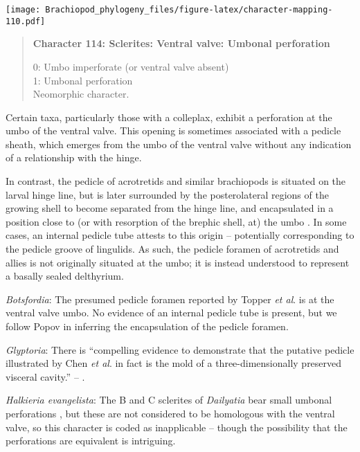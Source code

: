 \documentclass[openany]{book}
\theoremstyle{definition}
\theoremstyle{definition}
\theoremstyle{definition}
\theoremstyle{remark}
\begin{document}
\texttt{[image: Brachiopod\_phylogeny\_files/figure-latex/character-mapping-110.pdf]}

\begin{quote}
\textbf{Character 114: Sclerites: Ventral valve: Umbonal perforation}

0: Umbo imperforate (or ventral valve absent)\\
1: Umbonal perforation\\
Neomorphic character.
\end{quote}

Certain taxa, particularly those with a colleplax, exhibit a perforation
at the umbo of the ventral valve. This opening is sometimes associated
with a pedicle sheath, which emerges from the umbo of the ventral valve
without any indication of a relationship with the hinge.

In contrast, the pedicle of acrotretids and similar brachiopods is
situated on the larval hinge line, but is later surrounded by the
posterolateral regions of the growing shell to become separated from the
hinge line, and encapsulated in a position close to (or with resorption
of the brephic shell, at) the umbo \citep[see][pp.~407--411 and fig. 3
for discussion]{Popov1992TheCambrian}. In some cases, an internal
pedicle tube attests to this origin -- potentially corresponding to the
pedicle groove of lingulids. As such, the pedicle foramen of acrotretids
and allies is not originally situated at the umbo; it is instead
understood to represent a basally sealed delthyrium.

\hypertarget{Botsfordia-coding-114}{}
\emph{Botsfordia}: The presumed pedicle foramen reported by Topper
\emph{et al}. \citeyearpar{Topper2013Reappraisalof} is at the ventral
valve umbo. No evidence of an internal pedicle tube is present, but we
follow Popov \citeyearpar{Popov1992TheCambrian} in inferring the
encapsulation of the pedicle foramen.

\hypertarget{Glyptoria-coding-114}{}
\emph{Glyptoria}: There is ``compelling evidence to demonstrate that the
putative pedicle\\
illustrated by Chen \emph{et al}. \citeyearpar[Figs. 4, 6,
7]{Chen2007Reinterpretationof} in fact is the mold of a
three-dimensionally preserved visceral cavity.'' --
\citet{Zhang2009Architectureand}.

\hypertarget{Halkieria_evangelista-coding-114}{}
\emph{Halkieria evangelista}: The B and C sclerites of \emph{Dailyatia}
bear small umbonal perforations \citep{Skovsted2015Theearly}, but these
are not considered to be homologous with the ventral valve, so this
character is coded as inapplicable -- though the possibility that the
perforations are equivalent is intriguing.
\end{document}
